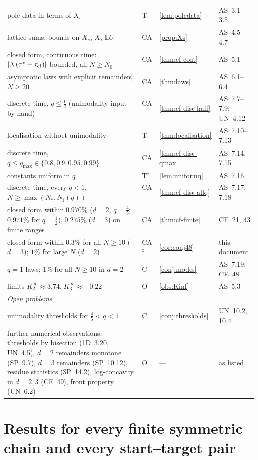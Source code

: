 \documentclass[10pt,a4paper]{article}
\theoremstyle{plain}
\theoremstyle{definition}
\newcommand{\NEW}{\ensuremath{^{\dagger}}}       %
\newcommand{\SYN}{\ensuremath{^{\ddagger}}}      %
\newcommand{\ONE}{\textsf{1D}}
\newcommand{\SPE}{\textsf{SP}}
\newcommand{\ASY}{\textsf{AS}}
\newcommand{\UNI}{\textsf{UN}}
\newcommand{\CER}{\textsf{CE}}
\newcommand{\E}{\mathbb{E}}
\begin{document}
{\begin{longtable}{p{}p{}p{}p{}}
pole data in terms of $X_s$ & T & \ref{lem:poledata} & \ASY\ 3.1--3.5\\
lattice sums, bounds on $X_s$, $X$, $\E U$ & CA & \ref{prop:Xs} & \ASY\ 4.5--4.7\\
closed form, continuous time: $|X(\tau^*-\tau_{\rm cf})|$ bounded, all $N\ge N_0$ & CA & \ref{thm:cf-cont} & \ASY\ 5.1\\
asymptotic laws with explicit remainders, $N\ge20$ & CA & \ref{thm:laws} & \ASY\ 6.1--6.4\\
discrete time, $q\le\frac12$ (unimodality input by hand) & CA\SYN & \ref{thm:cf-disc-half} & \ASY\ 7.7--7.9; \UNI\ 4.12\\
localisation without unimodality & T & \ref{thm:localisation} & \ASY\ 7.10--7.13\\
discrete time, $q\le q_{\max}\in\{0.8,0.9,0.95,0.99\}$ & CA & \ref{thm:cf-disc-qmax} & \ASY\ 7.14, 7.15\\
constants uniform in $q$ & T\NEW & \ref{lem:uniformq} & \ASY\ 7.16\\
discrete time, every $q<1$, $N\ge\max(N_*,N_1(q))$ & CA\NEW & \ref{thm:cf-disc-allq} & \ASY\ 7.17, 7.18\\
closed form within $0.970\%$ ($d=2$, $q=\frac45$; $0.971\%$ for $q=\frac12$), $0.275\%$ ($d=3$) on finite ranges & CA & \ref{thm:cf-finite} & \CER\ 21, 43\\
closed form within $0.3\%$ for all $N\ge10$ ($d=3$); $1\%$ for large $N$ ($d=2$) & CA\SYN & \ref{cor:conj48} & this document\\
$q=1$ laws; $1\%$ for all $N\ge10$ in $d=2$ & C & \ref{conj:modes} & \ASY\ 7.19; \CER\ 48\\
limits $K_2^\infty\approx3.74$, $K_3^\infty\approx-0.22$ & O & \ref{obs:Kinf} & \ASY\ 5.3\\
\midrule
\multicolumn{4}{l}{\emph{Open problems}}\\
unimodality thresholds for $\frac45<q<1$ & C & \ref{conj:thresholds} & \UNI\ 10.2, 10.4\\
further numerical observations: thresholds by bisection (\ONE\ 3.20, \UNI\ 4.5), $d=2$ remainders monotone (\SPE\ 9.7), $d=3$ remainders (\SPE\ 10.12), residue statistics (\SPE\ 14.2), log-concavity in $d=2,3$ (\CER\ 49), front property (\UNI\ 6.2) & O & --- & as listed\\
\bottomrule
\end{longtable}
}

\section{Results for every finite symmetric chain and every start--target pair}\label{sec:general}
\end{document}
